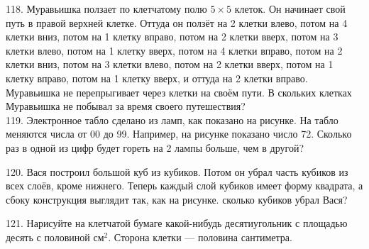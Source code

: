 \documentclass[12pt]{article}
\begin{document}
118. Муравьишка ползает по клетчатому полю $5\times5$ клеток. Он начинает свой путь в правой верхней клетке. Оттуда он ползёт на 2 клетки влево, потом на 4 клетки вниз, потом на 1 клетку вправо, потом на 2 клетки вверх, потом на 3 клетки влево, потом на 1 клетку вверх, потом на 4 клетки вправо, потом на 2 клетки вниз, потом на 3 клетки влево, потом на 2 клетки вверх, потом на 1 клетку вправо, потом на 1 клетку вверх, и оттуда на 2 клетки вправо. Муравьишка не перепрыгивает через клетки на своём пути. В скольких клетках Муравьишка не побывал за время своего путешествия?\\
119. Электронное табло сделано из ламп, как показано на рисунке. На табло меняются числа от 00 до 99. Например, на рисунке показано число 72. Сколько раз в одной из цифр будет гореть на 2 лампы больше, чем в другой?
\begin{center}
\begin{figure}[ht!]
\end{figure}
\end{center}
120. Вася построил большой куб из кубиков. Потом он убрал часть кубиков из всех слоёв, кроме нижнего. Теперь каждый слой кубиков имеет форму квадрата, а сбоку конструкция выглядит так, как на рисунке. сколько кубиков убрал Вася?
\begin{center}
\begin{figure}[ht!]
\end{figure}
\end{center}
121. Нарисуйте на клетчатой бумаге какой-нибудь десятиугольник с площадью десять с половиной $\text{см}^2.$ Сторона клетки --- половина сантиметра.\\
\end{document}
